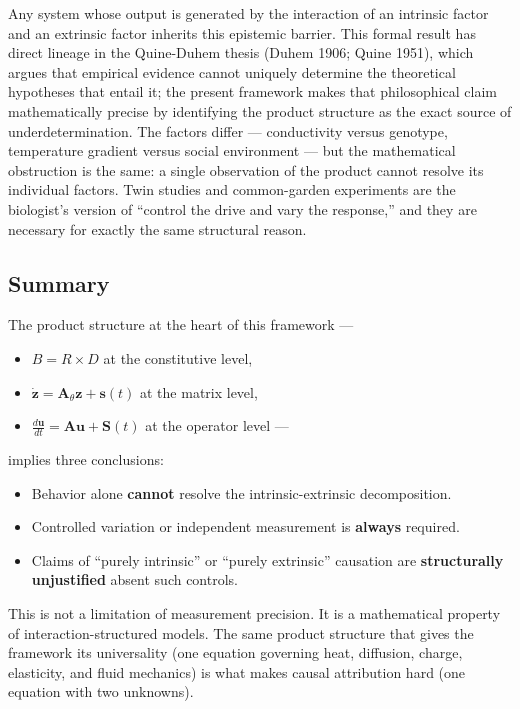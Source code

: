 \documentclass[
  letterpaper,
  DIV=11,
  numbers=noendperiod]{scrartcl}
\providecommand{\tightlist}{%
  \setlength{\itemsep}{0pt}\setlength{\parskip}{0pt}}
\begin{document}
Any system whose output is generated by the interaction of an intrinsic
factor and an extrinsic factor inherits this epistemic barrier. This
formal result has direct lineage in the Quine-Duhem thesis (Duhem 1906;
Quine 1951), which argues that empirical evidence cannot uniquely
determine the theoretical hypotheses that entail it; the present
framework makes that philosophical claim mathematically precise by
identifying the product structure as the exact source of
underdetermination. The factors differ --- conductivity versus genotype,
temperature gradient versus social environment --- but the mathematical
obstruction is the same: a single observation of the product cannot
resolve its individual factors. Twin studies and common-garden
experiments are the biologist's version of ``control the drive and vary
the response,'' and they are necessary for exactly the same structural
reason.

\subsection{Summary}\label{summary}

The product structure at the heart of this framework ---

\begin{itemize}
\tightlist
\item
  \(B = R \times D\) at the constitutive level,
\item
  \(\dot{\mathbf{z}} = \mathbf{A}_\theta \mathbf{z} + \mathbf{s}(t)\) at
  the matrix level,
\item
  \(\frac{d\mathbf{u}}{dt} = \mathbf{A}\mathbf{u} + \mathbf{S}(t)\) at
  the operator level ---
\end{itemize}

implies three conclusions:

\begin{itemize}
\tightlist
\item
  Behavior alone \textbf{cannot} resolve the intrinsic-extrinsic
  decomposition.
\item
  Controlled variation or independent measurement is \textbf{always}
  required.
\item
  Claims of ``purely intrinsic'' or ``purely extrinsic'' causation are
  \textbf{structurally unjustified} absent such controls.
\end{itemize}

This is not a limitation of measurement precision. It is a mathematical
property of interaction-structured models. The same product structure
that gives the framework its universality (one equation governing heat,
diffusion, charge, elasticity, and fluid mechanics) is what makes causal
attribution hard (one equation with two unknowns).
\end{document}
